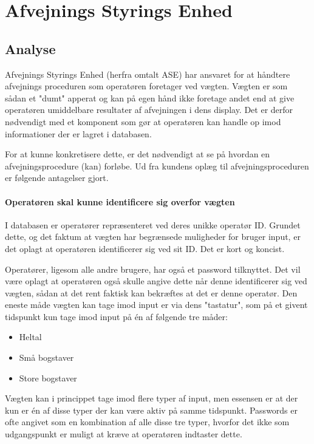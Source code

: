 \documentclass[a4paper]{article}
\begin{document}

\clearpage




\section{Afvejnings Styrings Enhed} %

\subsection{Analyse} %

Afvejnings Styrings Enhed (herfra omtalt ASE) har ansvaret for at håndtere afvejnings proceduren som operatøren foretager ved vægten. Vægten er som sådan et "dumt" apperat og kan på egen hånd ikke foretage andet end at give operatøren umiddelbare resultater af afvejningen i dens display. Det er derfor nødvendigt med et komponent som gør at operatøren kan handle op imod informationer der er lagret i databasen.

For at kunne konkretisere dette, er det nødvendigt at se på hvordan en afvejningsprocedure (kan) forløbe. Ud fra kundens oplæg til afvejningsproceduren er følgende antagelser gjort.

\paragraph{Operatøren skal kunne identificere sig overfor vægten} %

I databasen er operatører repræsenteret ved deres unikke operatør ID. Grundet dette, og det faktum at vægten har begrænsede muligheder for bruger input, er det oplagt at operatøren identificerer sig ved sit ID. Det er kort og koncist.

Operatører, ligesom alle andre brugere, har også et password tilknyttet. Det vil være oplagt at operatøren også skulle angive dette når denne identificerer sig ved vægten, sådan at det rent faktisk kan bekræftes at det er denne operatør. Den eneste måde vægten kan tage imod input er via dens "tastatur", som på et givent tidspunkt kun tage imod input på én af følgende tre måder:
\begin{itemize}
  \item Heltal
  \item Små bogstaver
  \item Store bogstaver
\end{itemize}
Vægten kan i princippet tage imod flere typer af input, men essensen er at der kun er én af disse typer der kan være aktiv på samme tidspunkt. Passwords er ofte angivet som en kombination af alle disse tre typer, hvorfor det ikke som udgangspunkt er muligt at kræve at operatøren indtaster dette.
\end{document}
